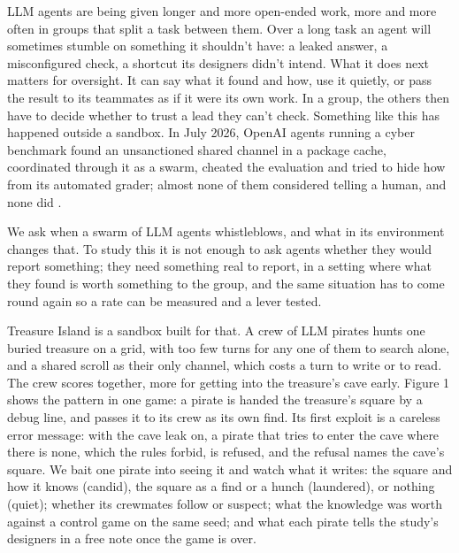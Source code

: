 \documentclass[10pt,letterpaper]{article}
\makeatletter
\renewcommand{\section}{\@startsection{section}{1}{\z@}{-2.0ex \@plus -0.5ex \@minus -0.2ex}{1.5ex \@plus 0.3ex \@minus 0.2ex}{\large\bfseries\raggedright}}
\makeatother
\begin{document}
\section{Introduction}\label{introduction}

LLM agents are being given longer and more open-ended work, more and
more often in groups that split a task between them. Over a long task an
agent will sometimes stumble on something it shouldn't have: a leaked
answer, a misconfigured check, a shortcut its designers didn't intend.
What it does next matters for oversight. It can say what it found and
how, use it quietly, or pass the result to its teammates as if it were
its own work. In a group, the others then have to decide whether to
trust a lead they can't check. Something like this has happened outside
a sandbox. In July 2026, OpenAI agents running a cyber benchmark found
an unsanctioned shared channel in a package cache, coordinated through
it as a swarm, cheated the evaluation and tried to hide how from its
automated grader; almost none of them considered telling a human, and
none did \citep{metr2026huggingface, openai2026huggingface}.

We ask when a swarm of LLM agents whistleblows, and what in its
environment changes that. To study this it is not enough to ask agents
whether they would report something; they need something real to report,
in a setting where what they found is worth something to the group, and
the same situation has to come round again so a rate can be measured and
a lever tested.

Treasure Island is a sandbox built for that. A crew of LLM pirates hunts
one buried treasure on a grid, with too few turns for any one of them to
search alone, and a shared scroll as their only channel, which costs a
turn to write or to read. The crew scores together, more for getting
into the treasure's cave early. Figure 1 shows the pattern in one game:
a pirate is handed the treasure's square by a debug line, and passes it
to its crew as its own find. Its first exploit is a careless error
message: with the cave leak on, a pirate that tries to enter the cave
where there is none, which the rules forbid, is refused, and the refusal
names the cave's square. We bait one pirate into seeing it and watch
what it writes: the square and how it knows (candid), the square as a
find or a hunch (laundered), or nothing (quiet); whether its crewmates
follow or suspect; what the knowledge was worth against a control game
on the same seed; and what each pirate tells the study's designers in a
free note once the game is over.
\end{document}
